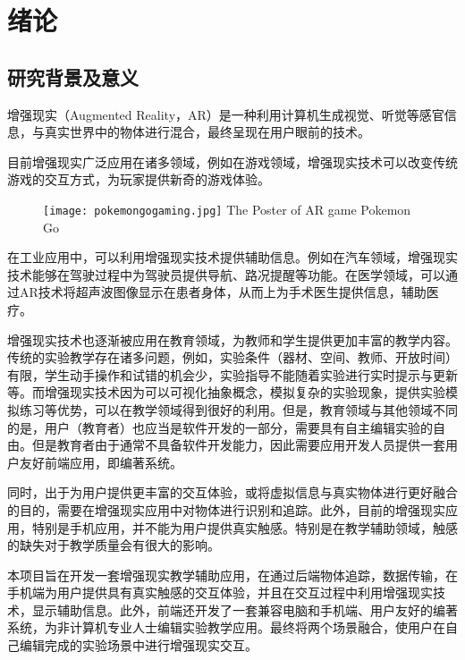 \chapter{绪论}
\label{chap:myIntro}

\section{研究背景及意义}
\label{sec:background}
增强现实（Augmented Reality，AR）是一种利用计算机生成视觉、听觉等感官信息，与真实世界中的物体进行混合，最终呈现在用户眼前的技术。\cite{ARconception}

目前增强现实广泛应用在诸多领域，例如在游戏领域，增强现实技术可以改变传统游戏的交互方式，为玩家提供新奇的游戏体验。
    
\begin{figure}[!htp]
  \centering
  \texttt{[image: pokemongogaming.jpg]}
    {The Poster of AR game Pokemon Go}
 \label{fig:longcaptionbad}
\end{figure}

在工业应用中，可以利用增强现实技术提供辅助信息。例如在汽车领域，增强现实技术能够在驾驶过程中为驾驶员提供导航、路况提醒等功能。\cite{ARdriving}在医学领域，可以通过AR技术将超声波图像显示在患者身体，从而上为手术医生提供信息，辅助医疗。\cite{billinghurst2002augmented}

增强现实技术也逐渐被应用在教育领域，为教师和学生提供更加丰富的教学内容。传统的实验教学存在诸多问题，例如，实验条件（器材、空间、教师、开放时间）有限，学生动手操作和试错的机会少，实验指导不能随着实验进行实时提示与更新等。而增强现实技术因为可以可视化抽象概念，模拟复杂的实验现象，提供实验模拟练习等优势，可以在教学领域得到很好的利用。\cite{wu2013current}但是，教育领域与其他领域不同的是，用户（教育者）也应当是软件开发的一部分，需要具有自主编辑实验的自由。但是教育者由于通常不具备软件开发能力，因此需要应用开发人员提供一套用户友好前端应用，即编著系统。

同时，出于为用户提供更丰富的交互体验，或将虚拟信息与真实物体进行更好融合的目的，需要在增强现实应用中对物体进行识别和追踪。此外，目前的增强现实应用，特别是手机应用，并不能为用户提供真实触感。特别是在教学辅助领域，触感的缺失对于教学质量会有很大的影响。

本项目旨在开发一套增强现实教学辅助应用，在通过后端物体追踪，数据传输，在手机端为用户提供具有真实触感的交互体验，并且在交互过程中利用增强现实技术，显示辅助信息。此外，前端还开发了一套兼容电脑和手机端、用户友好的编著系统，为非计算机专业人士编辑实验教学应用。最终将两个场景融合，使用户在自己编辑完成的实验场景中进行增强现实交互。

